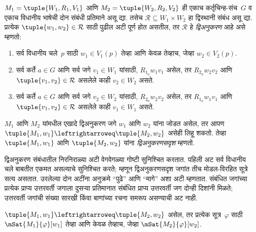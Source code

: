 \begin{defn}[द्विअनुकरण]
$M_1 = \tuple{W_1, R_1, V_1}$ आणि $M_2 = \tuple{W_2, R_2, V_2}$
ही एकाच कर्तृचिन्ह-संच~$G$ व एकाच विधानीय
भाषेची दोन संबंधी प्रतिमाने असू द्या. तसेच
$\mathcal{R} \subseteq W_1 \times W_2$ हा द्विस्थानी
संबंध असू द्या. प्रत्येक $\tuple{w_1, w_2} \in
\mathcal{R}$ साठी पुढील अटी पूर्ण होत असतील, तर
$\mathcal{R}$ हे \emph{द्विअनुकरण} आहे असे म्हणतो:

\begin{enumerate}
  \item सर्व विधानीय चले~$p$ साठी
  $w_1 \in V_1(p)$ तेव्हा आणि केवळ तेव्हाच, जेव्हा
  $w_2 \in V_2(p)$.
  \item सर्व कर्ते $a \in G$ आणि सर्व जगे $v_1 \in W_1$
  यांसाठी, $R_{1_a} w_1 v_1$ असेल, तर $R_{2_a} w_2 v_2$
  आणि $\tuple{v_1, v_2} \in \mathcal{R}$ असलेले काही
  $v_2 \in W_2$ असते.
  \item सर्व कर्ते $a \in G$ आणि सर्व जगे $v_2 \in W_2$
  यांसाठी, $R_{2_a} w_2 v_2$ असेल, तर $R_{1_a} w_1 v_1$
  आणि $\tuple{v_1, v_2} \in \mathcal{R}$ असलेले काही
  $v_1 \in W_1$ असते.
\end{enumerate}

$M_1$ आणि $M_2$ यांमधील एखादे द्विअनुकरण जगे
$w_1$ आणि $w_2$ यांना जोडत असेल, तर आपण
$\tuple{M_1, w_1} \leftrightarroweq
\tuple{M_2, w_2}$ असेही लिहू शकतो. तेव्हा
$\tuple{M_1, w_1}$ आणि $\tuple{M_2, w_2}$ यांना
\emph{द्विअनुकरणसदृश} म्हणतो.
\end{defn}

द्विअनुकरण संबंधातील निरनिराळ्या अटी वेगवेगळ्या
गोष्टी सुनिश्चित करतात. पहिली अट सर्व विधानीय चले
बाबतीत एकमत असल्याचे सुनिश्चित करते;
म्हणून द्विअनुकरणसदृश जगांत तीच मोडल-विरहित सूत्रे
सत्य असतात. उरलेल्या दोन अटींना अनुक्रमे ``पुढे''
आणि ``मागे'' अशा अटी म्हणतात. संबंधित जगांच्या प्रत्येक
प्राप्य उत्तरवर्ती जगाला दुसऱ्या प्रतिमानात संबंधित
प्राप्य उत्तरवर्ती जग दोन्ही दिशांनी मिळते; उत्तरवर्ती
जगांची संख्या सारखी किंवा बाणांच्या रचना समरूप असण्याची अट नाही.

\begin{thm}
$\tuple{M_1, w_1} \leftrightarroweq \tuple{M_2, w_2}$
असेल, तर प्रत्येक सूत्र~$\varphi$ साठी
$\mSat{M_1}{\varphi}[w_1]$ तेव्हा आणि केवळ तेव्हाच,
जेव्हा $\mSat{M_2}{\varphi}[w_2]$.
\end{thm}

